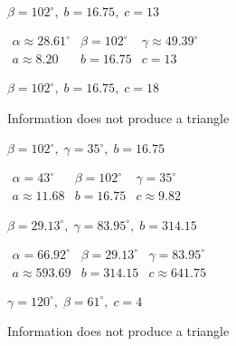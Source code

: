 \documentclass{ximera}
\begin{document}
\begin{question}
\begin{problem}
$\beta = 102^{\circ}, \; b = 16.75, \; c = 13$

\begin{solution}
$\begin{array}{lll}
\alpha \approx 28.61^{\circ} & \beta = 102^{\circ} & \gamma \approx 49.39^{\circ} \\
a \approx 8.20 & b = 16.75 & c = 13 \end{array}$
\end{solution}
\end{problem}

\begin{problem}
$\beta = 102^{\circ}, \; b = 16.75, \; c = 18$

\begin{solution}
Information does not produce a triangle
\end{solution}
\end{problem}

\begin{problem}
$\beta = 102^{\circ}, \; \gamma = 35^{\circ}, \; b = 16.75$

\begin{solution}
$\begin{array}{lll}
\alpha = 43^{\circ} & \beta = 102^{\circ} & \gamma = 35^{\circ} \\
a \approx 11.68 & b = 16.75 & c \approx 9.82 \end{array}$
\end{solution}
\end{problem}

\begin{problem}
$\beta = 29.13^{\circ}, \; \gamma = 83.95^{\circ}, \; b = 314.15$

\begin{solution}
$\begin{array}{lll}
\alpha = 66.92^{\circ} & \beta = 29.13^{\circ} & \gamma = 83.95^{\circ} \\
a \approx 593.69 & b = 314.15 & c \approx 641.75 \end{array}$
\end{solution}
\end{problem}

\begin{problem}
$\gamma = 120^{\circ}, \; \beta = 61^{\circ}, \; c = 4$

\begin{solution}
Information does not produce a triangle
\end{solution}
\end{problem}


\end{question}
\end{document}
